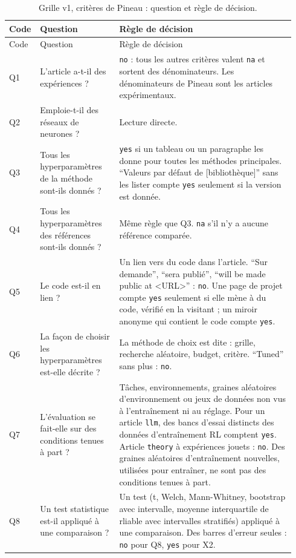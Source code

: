 \begin{small}
\begin{longtable}{@{}p{0.07\linewidth}>{\raggedright\arraybackslash}p{0.27\linewidth}>{\raggedright\arraybackslash}p{0.6\linewidth}@{}}
\caption{Grille v1, critères de Pineau : question et règle de décision.}\label{tab:a-grille-q}\\
\toprule
Code & Question & Règle de décision \\
\midrule
\endfirsthead
\toprule
Code & Question & Règle de décision \\
\midrule
\endhead
\bottomrule
\endfoot
Q1 & L'article a-t-il des expériences ? & \texttt{no} : tous les autres critères valent \texttt{na}
  et sortent des dénominateurs. Les dénominateurs de Pineau sont les articles
  expérimentaux. \\
Q2 & Emploie-t-il des réseaux de neurones ? & Lecture directe. \\
Q3 & Tous les hyperparamètres de la méthode sont-ils donnés ? & \texttt{yes} si un tableau ou un
  paragraphe les donne pour toutes les méthodes principales. \enquote{Valeurs par défaut de
  [bibliothèque]} sans les lister compte \texttt{yes} seulement si la version est donnée. \\
Q4 & Tous les hyperparamètres des références sont-ils donnés ? & Même règle que Q3. \texttt{na}
  s'il n'y a aucune référence comparée. \\
Q5 & Le code est-il en lien ? & Un lien vers du code dans l'article. \enquote{Sur demande},
  \enquote{sera publié}, \enquote{will be made public at <URL>} : \texttt{no}. Une page de projet
  compte \texttt{yes} seulement si elle mène à du code, vérifié en la visitant ;
  un miroir anonyme qui contient le code compte \texttt{yes}. \\
Q6 & La façon de choisir les hyperparamètres est-elle décrite ? & La méthode de choix est dite :
  grille, recherche aléatoire, budget, critère. \enquote{Tuned} sans plus : \texttt{no}. \\
Q7 & L'évaluation se fait-elle sur des conditions tenues à part ? & Tâches, environnements, graines
  aléatoires d'environnement ou jeux de données non vus à l'entraînement ni au réglage. Pour un
  article \texttt{llm}, des bancs d'essai distincts des données d'entraînement RL comptent
  \texttt{yes}. Article \texttt{theory} à expériences jouets : \texttt{no}. Des graines aléatoires
  d'entraînement nouvelles, utilisées pour entraîner, ne sont pas des conditions tenues à part. \\
Q8 & Un test statistique est-il appliqué à une comparaison ? & Un test (t, Welch, Mann-Whitney,
  bootstrap avec intervalle, moyenne interquartile de rliable avec intervalles stratifiés) appliqué
  à une comparaison. Des barres d'erreur seules : \texttt{no} pour Q8, \texttt{yes} pour X2. \\
\end{longtable}
\end{small}

